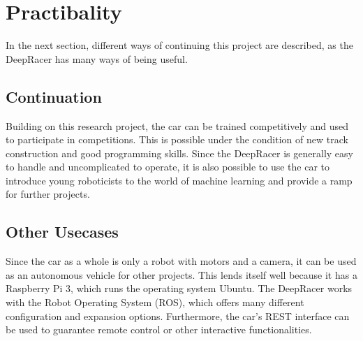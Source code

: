 \section{Practibality}
In the next section, different ways of continuing this project are described, as the DeepRacer has many ways of being useful. 
\subsection{Continuation}
Building on this research project, the car can be trained competitively and used to participate in competitions. This is possible under the condition of new track construction and good programming skills. \newline
Since the DeepRacer is generally easy to handle and uncomplicated to operate, it is also possible to use the car to introduce young roboticists to the world of machine learning and provide a ramp for further projects.
\subsection{Other Usecases}
Since the car as a whole is only a robot with motors and a camera, it can be used as an autonomous vehicle for other projects. This lends itself well because it has a Raspberry Pi 3, which runs the operating system Ubuntu. The DeepRacer works with the Robot Operating System (ROS), which offers many different configuration and expansion options. Furthermore, the car's REST interface can be used to guarantee remote control or other interactive functionalities.